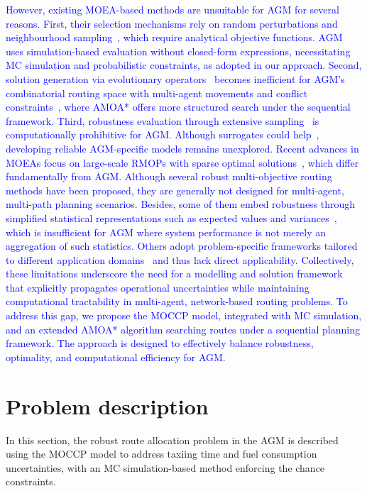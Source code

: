 \documentclass{article}
\newcommand*{\blue}{\textcolor{blue}}
\begin{document}
\blue{However, existing MOEA-based methods are unsuitable for AGM for several reasons. First, their selection mechanisms rely on random perturbations and neighbourhood sampling~\cite{30,42,43}, which require analytical objective functions. AGM uses simulation-based evaluation without closed-form expressions, necessitating MC simulation and probabilistic constraints, as adopted in our approach. Second, solution generation via evolutionary operators~\cite{46,47} becomes inefficient for AGM's combinatorial routing space with multi-agent movements and conflict constraints~\cite{ravizza2014more,wang2021chance}, where AMOA* offers more structured search under the sequential framework. Third, robustness evaluation through extensive sampling~\cite{30,40,43} is computationally prohibitive for AGM. Although surrogates could help~\cite{45}, developing reliable AGM-specific models remains unexplored. Recent advances in MOEAs focus on large-scale RMOPs with sparse optimal solutions~\cite{49},  which differ fundamentally from AGM. Although several robust multi-objective routing methods have been proposed, they are generally not designed for multi-agent, multi-path planning scenarios. Besides, some of them embed robustness through simplified statistical representations such as expected values and variances~\cite{bozorgi2013multi,cintrano2019facing}, which is insufficient for AGM where system performance is not merely an aggregation of such statistics. Others adopt problem-specific frameworks tailored to different application domains~\cite{guo2017robust, xu2025multi} and thus lack direct applicability. Collectively, these limitations underscore the need for a modelling and solution framework that explicitly propagates operational uncertainties while maintaining computational tractability in multi-agent, network-based routing problems. 
To address this gap, we propose the MOCCP model, integrated with MC simulation, and an extended AMOA* algorithm searching routes under a sequential planning framework. The approach is designed to effectively balance robustness, optimality, and computational efficiency for AGM.  
}

\section{Problem description}
In this section, the robust route allocation problem in the AGM is described using the MOCCP model to address taxiing time and fuel consumption uncertainties, with an MC simulation-based method enforcing the chance constraints.
\end{document}
